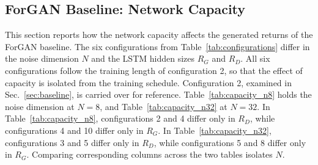 \subsection{ForGAN Baseline: Network Capacity}\label{sec:network-capacity}
This section reports how the network capacity affects the generated returns of the ForGAN baseline. The six configurations from Table~\ref{tab:configurations} differ in the noise dimension $N$ and the LSTM hidden sizes $R_G$ and $R_D$. All six configurations follow the training length of configuration 2, so that the effect of capacity is isolated from the training schedule. Configuration 2, examined in Sec.~\ref{sec:baseline}, is carried over for reference. Table~\ref{tab:capacity_n8} holds the noise dimension at $N = 8$, and Table~\ref{tab:capacity_n32} at $N = 32$. In Table~\ref{tab:capacity_n8}, configurations 2 and 4 differ only in $R_D$, while configurations 4 and 10 differ only in $R_G$. In Table~\ref{tab:capacity_n32}, configurations 3 and 5 differ only in $R_D$, while configurations 5 and 8 differ only in $R_G$. Comparing corresponding columns across the two tables isolates $N$.

